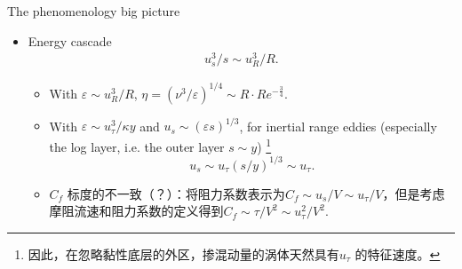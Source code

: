 \documentclass[10pt,xcolor={table,dvipsnames},t]{beamer}
\begin{document}
\begin{frame}{The phenomenology big picture}
    \begin{itemize}
        \item Energy cascade
            \begin{align*}
                u_s^3 / s \sim u_R^3 / R
            .\end{align*}
            \begin{itemize}
                \item With $\varepsilon \sim u_R^3 / R$, $\eta = \left( \nu^3 / \varepsilon \right)^{1 / 4}\sim R\cdot Re^{-\frac{3}{4}} $.
                \item With $\varepsilon  \sim {u_{\tau }^3}/{\kappa y}$ and $u_s\sim \left( \varepsilon s \right) ^{1 / 3} $, for inertial range eddies (especially the log layer, i.e. the outer layer $s \sim y$) \footnote{因此，在忽略黏性底层的外区，掺混动量的涡体天然具有$u_{\tau }$ 的特征速度。} 
                    $$u_s \sim u_{\tau } \left( s / y \right) ^{1 / 3} \sim u_{\tau}.$$ 
                \item $C_f$ 标度的不一致（？）：\citet{gioiaFriction2006}将阻力系数表示为$C_f \sim u_s / V \sim u_{\tau } / V$，但是考虑摩阻流速和阻力系数的定义得到$C_f \sim \tau / V^2 \sim u_{\tau }^2 / V^2$.
            \end{itemize}
    \end{itemize}
\end{frame}
\end{document}
